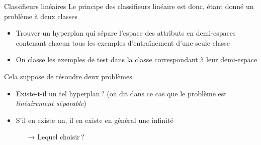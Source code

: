 \documentclass[hyperref={unicode}, xcolor={svgnames}, french]{beamer}
\begin{document}
\begin{frame}{Classifieurs linéaires}
    Le principe des classifieurs linéaire est donc, étant donné un problème à deux classes
    \begin{itemize}
        \item Trouver un hyperplan qui sépare l'espace des attributs en demi-espaces contenant chacun tous les exemples d'entraînement d'une seule classe
        \item On classe les exemples de test dans la classe correspondant à leur demi-espace
    \end{itemize}

    Cela suppose de résoudre deux problèmes
    \begin{itemize}
        \item Existe-t-il un tel hyperplan ? (on dit dans ce cas que le problème est \emph{linéairement séparable})
        \item S'il en existe un, il en existe en général une infinité
            \begin{itemize}
                \item[→] Lequel choisir ?
            \end{itemize}
    \end{itemize}
\end{frame}
\end{document}
